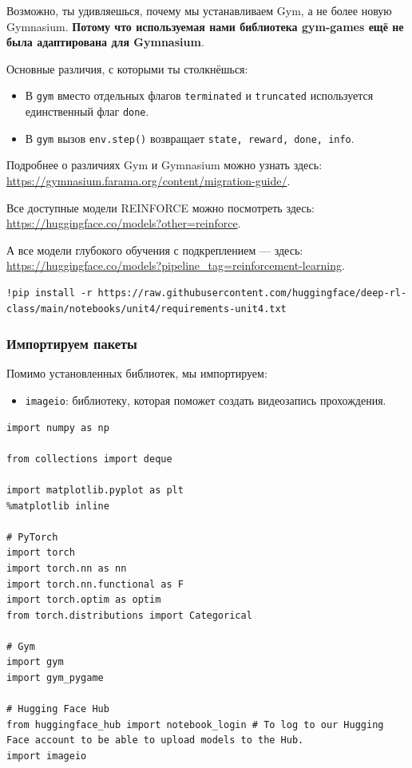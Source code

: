 \documentclass[11pt,a4paper]{article}
\begin{document}
Возможно, ты удивляешься, почему мы устанавливаем Gym, а не более новую Gymnasium. \textbf{Потому что используемая нами библиотека gym-games ещё не была адаптирована для Gymnasium}.

Основные различия, с которыми ты столкнёшься:

\begin{itemize}
\tightlist
\item
  В \texttt{gym} вместо отдельных флагов \texttt{terminated} и \texttt{truncated} используется единственный флаг \texttt{done}.
\item
  В \texttt{gym} вызов \texttt{env.step()} возвращает \texttt{state,\ reward,\ done,\ info}.
\end{itemize}

Подробнее о различиях Gym и Gymnasium можно узнать здесь: \url{https://gymnasium.farama.org/content/migration-guide/}.

Все доступные модели REINFORCE можно посмотреть здесь: \url{https://huggingface.co/models?other=reinforce}.

А все модели глубокого обучения с подкреплением --- здесь: \url{https://huggingface.co/models?pipeline_tag=reinforcement-learning}.

\begin{lstlisting}
!pip install -r https://raw.githubusercontent.com/huggingface/deep-rl-class/main/notebooks/unit4/requirements-unit4.txt
\end{lstlisting}

\subsubsection{Импортируем пакеты}\label{import-the-packages}

Помимо установленных библиотек, мы импортируем:

\begin{itemize}
\tightlist
\item
  \texttt{imageio}: библиотеку, которая поможет создать видеозапись прохождения.
\end{itemize}

\begin{lstlisting}
import numpy as np

from collections import deque

import matplotlib.pyplot as plt
%matplotlib inline

# PyTorch
import torch
import torch.nn as nn
import torch.nn.functional as F
import torch.optim as optim
from torch.distributions import Categorical

# Gym
import gym
import gym_pygame

# Hugging Face Hub
from huggingface_hub import notebook_login # To log to our Hugging Face account to be able to upload models to the Hub.
import imageio
\end{lstlisting}
\end{document}
